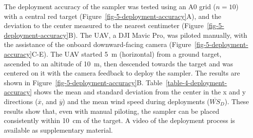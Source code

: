 The deployment accuracy of the sampler was tested using an A0 grid ($n=10$) with a central red target (Figure~\ref{fig-5-deployment-accuracy}A), and the deviation to the center measured to the nearest centimeter (Figure~\ref{fig-5-deployment-accuracy}B). The UAV, a DJI Mavic Pro, was piloted manually, with the assistance of the onboard downward-facing camera (Figure~\ref{fig-5-deployment-accuracy}C-E). The UAV started 5~m (horizontal) from a ground target, ascended to an altitude of 10~m, then descended towards the target and was centered on it with the camera feedback to deploy the sampler. The results are shown in Figure~\ref{fig-5-deployment-accuracy}B. Table~\ref{table-4-deployment-accuracy} shows the mean and standard deviation from the center in the x and y directions ($\overline{x}$, and $\overline{y}$) and the mean wind speed during deployments ($\overline{WS}_D$). These results show that, even with manual piloting, the sampler can be placed consistently within 10~cm of the target. A video of the deployment process is available as supplementary material.


